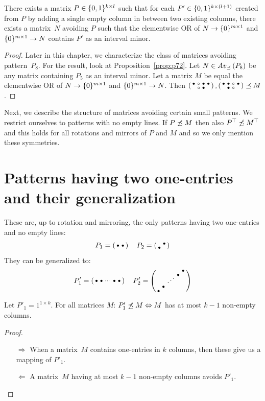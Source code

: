 \begin{prop}
There exists a matrix $P\in\{0,1\}^{k\times l}$ such that for each $P'\in\{0,1\}^{k\times(l+1)}$ created from $P$ by adding a single empty column in between two existing columns, there exists a matrix~$N$ avoiding $P$ such that the elementwise OR of $N\rightarrow\{0\}^{m\times 1}$ and $\{0\}^{m\times 1}\rightarrow N$ contains $P'$ as an interval minor.
\end{prop}
\begin{proof}
Later in this chapter, we characterize the class of matrices avoiding pattern~$P_8$. For the result, look at Proposition~\ref{prop:p72}. Let $N\in Av_{\preceq}\left(P_8\right)$ be any matrix containing $P_5$ as an interval minor. Let a matrix $M$ be equal the elementwise OR of $N\rightarrow\{0\}^{m\times 1}$ and $\{0\}^{m\times 1}\rightarrow N$. Then $\left(\begin{smallmatrix}\bullet&\circ&\bullet&\bullet\\ &\circ&\bullet& \end{smallmatrix}\right),\left(\begin{smallmatrix}\bullet&\bullet&\circ&\bullet\\ &\bullet&\circ& \end{smallmatrix}\right)\preceq M$.
\end{proof}

Next, we describe the structure of matrices avoiding certain small patterns. We restrict ourselves to patterns with no empty lines. If $P\not\preceq M$ then also $P^\top\not\preceq M^\top$ and this holds for all rotations and mirrors of $P$ and $M$ and so we only mention these symmetries.

\section{Patterns having two one-entries and their generalization}
\label{sec:2ones}
These are, up to rotation and mirroring, the only patterns having two one-entries and no empty lines:
$$P_1=\smm{\bullet&\bullet}\ \ 
\ P_2=\smm{ &\bullet\\\bullet& }$$
They can be generalized to:
$$P'_1=\smm{\bullet&\bullet&\cdots&\bullet&\bullet}\ \ 
\ P'_2=\smm{ & & & &\bullet\\ & & &\bullet& \\ & &\Ddots& & \\ &\bullet& & & \\\bullet& & & & }$$

\begin{prop}
Let $P'_1=1^{1\times k}$. For all matrices $M$: $P'_1\not\preceq M\Leftrightarrow M$ has at most $k-1$ non-empty columns.
\end{prop}
\begin{proof}
\begin{itemize}
	\item[$\Rightarrow$] When a matrix~$M$ contains one-entries in $k$ columns, then these give us a mapping of $P'_1$.
	\item[$\Leftarrow$] A matrix~$M$ having at most $k-1$ non-empty columns avoids $P'_1$. \qedhere
\end{itemize}
\end{proof}

